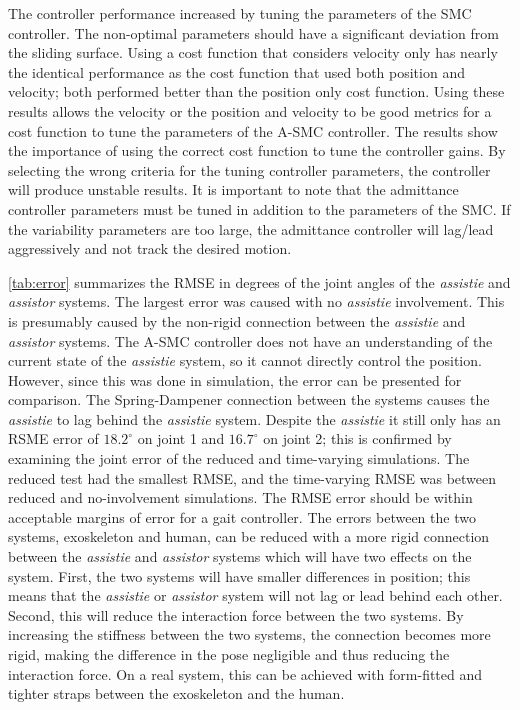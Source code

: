 The controller performance increased by tuning the parameters of the SMC controller. The non-optimal parameters should have a significant deviation from the sliding surface. Using a cost function that considers velocity only has nearly the identical performance as the cost function that used both position and velocity; both performed better than the position only cost function. Using these results allows the velocity or the position and velocity to be good metrics for a cost function to tune the parameters of the A-SMC controller. The results show the importance of using the correct cost function to tune the controller gains. By selecting the wrong criteria for the tuning controller parameters, the controller will produce unstable results. It is important to note that the admittance controller parameters must be tuned in addition to the parameters of the SMC. If the variability parameters are too large, the admittance controller will lag/lead aggressively and not track the desired motion. 

\autoref{tab:error} summarizes the RMSE in degrees of the joint angles of the \textit{assistie} and \textit{assistor} systems. The largest error was caused with no  \textit{assistie} involvement. This is presumably caused by the non-rigid connection between the  \textit{assistie} and \textit{assistor} systems. The A-SMC controller does not have an understanding of the current state of the \textit{assistie} system, so it cannot directly control the position. However, since this was done in simulation, the error can be presented for comparison. The Spring-Dampener connection between the systems causes the \textit{assistie} to lag behind the \textit{assistie} system. Despite the \textit{assistie} it still only has an RSME error of $18.2^{\circ}$ on joint 1 and $16.7^{\circ}$ on joint 2; this is confirmed by examining the joint error of the reduced and time-varying simulations. The reduced test had the smallest RMSE, and the time-varying RMSE was between reduced and no-involvement simulations. The RMSE error should be within acceptable margins of error for a gait controller. The errors between the two systems, exoskeleton and human, can be reduced with a more rigid connection between the \textit{assistie} and \textit{assistor} systems which will have two effects on the system. First, the two systems will have smaller differences in position; this means that the \textit{assistie} or \textit{assistor} system will not lag or lead behind each other. Second, this will reduce the interaction force between the two systems. By increasing the stiffness between the two systems, the connection becomes more rigid, making the difference in the pose negligible and thus reducing the interaction force. On a real system, this can be achieved with form-fitted and tighter straps between the exoskeleton and the human.    


